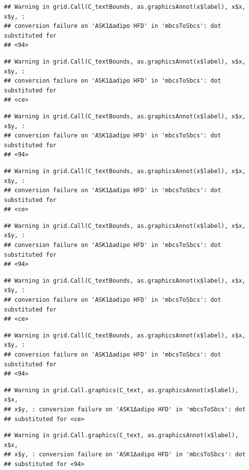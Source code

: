\documentclass[]{book}
\begin{document}
\begin{verbatim}
## Warning in grid.Call(C_textBounds, as.graphicsAnnot(x$label), x$x, x$y, :
## conversion failure on 'ASK1Δadipo HFD' in 'mbcsToSbcs': dot substituted for
## <94>
\end{verbatim}

\begin{verbatim}
## Warning in grid.Call(C_textBounds, as.graphicsAnnot(x$label), x$x, x$y, :
## conversion failure on 'ASK1Δadipo HFD' in 'mbcsToSbcs': dot substituted for
## <ce>
\end{verbatim}

\begin{verbatim}
## Warning in grid.Call(C_textBounds, as.graphicsAnnot(x$label), x$x, x$y, :
## conversion failure on 'ASK1Δadipo HFD' in 'mbcsToSbcs': dot substituted for
## <94>
\end{verbatim}

\begin{verbatim}
## Warning in grid.Call(C_textBounds, as.graphicsAnnot(x$label), x$x, x$y, :
## conversion failure on 'ASK1Δadipo HFD' in 'mbcsToSbcs': dot substituted for
## <ce>
\end{verbatim}

\begin{verbatim}
## Warning in grid.Call(C_textBounds, as.graphicsAnnot(x$label), x$x, x$y, :
## conversion failure on 'ASK1Δadipo HFD' in 'mbcsToSbcs': dot substituted for
## <94>
\end{verbatim}

\begin{verbatim}
## Warning in grid.Call(C_textBounds, as.graphicsAnnot(x$label), x$x, x$y, :
## conversion failure on 'ASK1Δadipo HFD' in 'mbcsToSbcs': dot substituted for
## <ce>
\end{verbatim}

\begin{verbatim}
## Warning in grid.Call(C_textBounds, as.graphicsAnnot(x$label), x$x, x$y, :
## conversion failure on 'ASK1Δadipo HFD' in 'mbcsToSbcs': dot substituted for
## <94>
\end{verbatim}

\begin{verbatim}
## Warning in grid.Call.graphics(C_text, as.graphicsAnnot(x$label), x$x,
## x$y, : conversion failure on 'ASK1Δadipo HFD' in 'mbcsToSbcs': dot
## substituted for <ce>
\end{verbatim}

\begin{verbatim}
## Warning in grid.Call.graphics(C_text, as.graphicsAnnot(x$label), x$x,
## x$y, : conversion failure on 'ASK1Δadipo HFD' in 'mbcsToSbcs': dot
## substituted for <94>
\end{verbatim}
\end{document}
